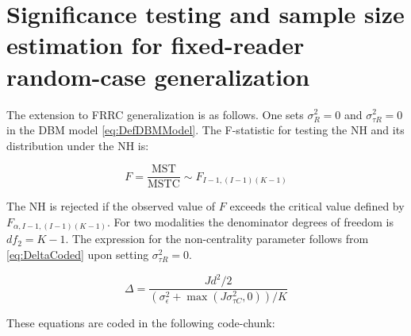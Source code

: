 \documentclass[
]{book}
\begin{document}
\hypertarget{significance-testing-and-sample-size-estimation-for-fixed-reader-random-case-generalization}{%
\section{Significance testing and sample size estimation for fixed-reader random-case generalization}\label{significance-testing-and-sample-size-estimation-for-fixed-reader-random-case-generalization}}

The extension to FRRC generalization is as follows. One sets \(\sigma_R^2 = 0\) and \(\sigma_{\tau R}^2 = 0\) in the DBM model \eqref{eq:DefDBMModel}. The F-statistic for testing the NH and its distribution under the NH is:

\begin{equation}
F=\frac{\text{MST}}{\text{MSTC}} \sim F_{I-1,(I-1)(K-1)}
\label{eq:DefFStatFRRC-DBM1}
\end{equation}

The NH is rejected if the observed value of \(F\) exceeds the critical value defined by \(F_{\alpha, I-1,(I-1)(K-1)}\). For two modalities the denominator degrees of freedom is \(df_2 = K-1\). The expression for the non-centrality parameter follows from \eqref{eq:DeltaCoded} upon setting \(\sigma_{\tau R}^2 = 0\).

\begin{equation}
\Delta=\frac{Jd^2/2}{(\sigma_{\epsilon}^2+\max(J\sigma_{\tau C}^2,0))/K}
\label{eq:DefDeltaFRRC}
\end{equation}

These equations are coded in the following code-chunk:
\end{document}
